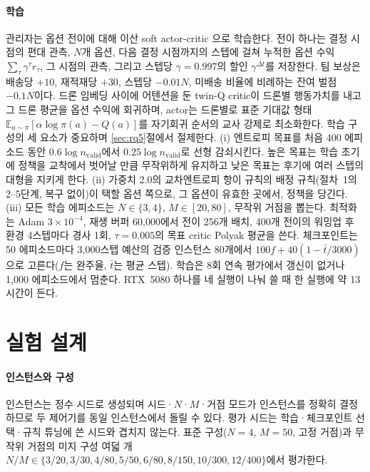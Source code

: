 \documentclass[final,5p,times,twocolumn]{elsarticle}
\begin{document}
\paragraph{학습}
관리자는 옵션 전이에 대해 이산 soft actor-critic \cite{haarnoja2018}으로 학습한다. 전이 하나는
결정 시점의 편대 관측, $N$개 옵션, 다음 결정 시점까지의 스텝에 걸쳐 누적한 옵션 수익
$\sum_{\tau} \gamma^{\tau} r_{\tau}$, 그 시점의 관측, 그리고 스텝당 $\gamma = 0.997$의 할인
$\gamma^{\Delta t}$를 저장한다. 팀 보상은 배송당 $+10$, 재적재당 $+30$, 스텝당 $-0.01N$, 미배송
비율에 비례하는 잔여 벌점 $-0.1N$이다. 드론 임베딩 사이에 어텐션을 둔 twin-Q critic이 드론별
행동가치를 내고 그 드론 평균을 옵션 수익에 회귀하며, actor는 드론별로 표준 기대값 형태
$\mathbb{E}_{a \sim \pi}[\alpha \log \pi(a) - Q(a)]$를 자기회귀 순서의 교사 강제로 최소화한다.
학습 구성의 세 요소가 중요하며 \ref{sec:rq5}절에서 절제한다. (i) 엔트로피 목표를 처음 400 에피소드
동안 $0.6 \log n_{\mathrm{valid}}$에서 $0.25 \log n_{\mathrm{valid}}$로 선형 감쇠시킨다. 높은
목표는 학습 초기에 정책을 교착에서 벗어날 만큼 무작위하게 유지하고 낮은 목표는 후기에 여러 스텝의
대형을 지키게 한다. (ii) 가중치 2.0의 교차엔트로피 항이 규칙의 배정 규칙(절차~1의 2--5단계,
복구 없이)이 택할 옵션 쪽으로, 그 옵션이 유효한 곳에서, 정책을 당긴다. (iii) 모든 학습
에피소드는 $N \in \{3,4\}$, $M \in [20,80]$, 무작위 거점을 뽑는다. 최적화는 Adam
$3 \times 10^{-4}$, 재생 버퍼 60{,}000에서 전이 256개 배치, 400개 전이의 워밍업 후 환경 4스텝마다
경사 1회, $\tau = 0.005$의 목표 critic Polyak 평균을 쓴다. 체크포인트는 50 에피소드마다
3{,}000스텝 예산의 검증 인스턴스 80개에서 $100f + 40(1 - \bar t/3000)$으로 고른다($f$는 완주율, $\bar
t$는 평균 스텝). 학습은 8회 연속 평가에서 갱신이 없거나 1{,}000 에피소드에서 멈춘다. RTX~5080
하나를 네 실행이 나눠 쓸 때 한 실행에 약 13시간이 든다.

\section{실험 설계}
\label{sec:setup}

\paragraph{인스턴스와 구성}
인스턴스는 정수 시드로 생성되며 시드·$N$·$M$·거점 모드가 인스턴스를 정확히 결정하므로 두 제어기를
동일 인스턴스에서 돌릴 수 있다. 평가 시드는 학습·체크포인트 선택·규칙 튜닝에 쓴 시드와 겹치지
않는다. 표준 구성($N=4$, $M=50$, 고정 거점)과 무작위 거점의 미지 구성 여덟 개
$N/M \in \{3/20, 3/30, 4/80, 5/50, 6/80, 8/150, 10/300, 12/400\}$에서 평가한다.
\end{document}
